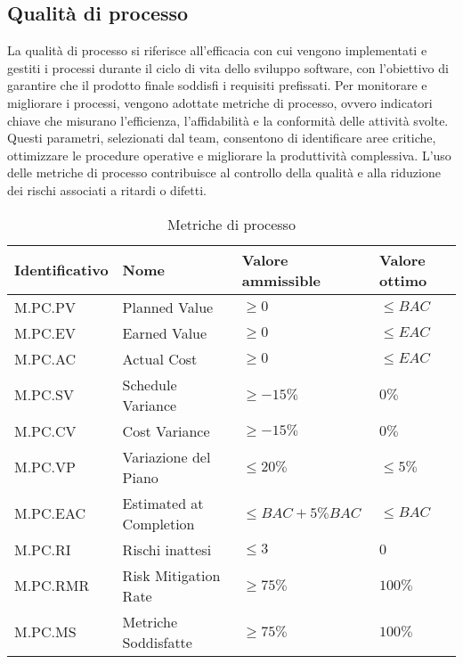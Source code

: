 \subsection{Qualità di processo}
\label{subsec:obiettivi_processo}
La qualità di processo si riferisce all'efficacia con cui vengono implementati e gestiti i processi durante il ciclo di vita dello sviluppo software, 
con l'obiettivo di garantire che il prodotto finale soddisfi i requisiti prefissati. 
Per monitorare e migliorare i processi, vengono adottate metriche di processo, ovvero indicatori chiave che misurano l'efficienza, l'affidabilità 
e la conformità delle attività svolte. 
Questi parametri, selezionati dal team, consentono di identificare aree critiche, ottimizzare le procedure operative e migliorare la produttività complessiva. 
L'uso delle metriche di processo contribuisce al controllo della qualità e alla riduzione dei rischi associati a ritardi o difetti.


\begin{table}[H]
    \centering
    \begin{tabular}{| l | l | l | l |}
    \hline
    \textbf{Identificativo} & 
    \textbf{Nome} &
    \textbf{Valore ammissible} &
    \textbf{Valore ottimo}\\
    \hline
        M.PC.PV & Planned Value & $\geq 0$ & $\leq BAC$ \\
    \hline
        M.PC.EV & Earned Value & $\geq 0$ & $\leq EAC$ \\
    \hline
        M.PC.AC & Actual Cost & $\geq 0$ & $\leq EAC$ \\
    \hline
        M.PC.SV & Schedule Variance & $\geq -15\%$ & $0\%$ \\
    \hline
        M.PC.CV & Cost Variance & $\geq -15\%$ & $0\%$ \\
    \hline  
        M.PC.VP & Variazione del Piano & $\leq 20\%$ & $\leq 5\%$ \\
    \hline
        M.PC.EAC & Estimated at Completion & $\leq BAC+5\% BAC$ & $\leq BAC$ \\
    \hline
        M.PC.RI & Rischi inattesi & $\leq 3$ & $0$ \\
    \hline
        M.PC.RMR & Risk Mitigation Rate & $\geq 75\%$ & $100\%$ \\
    \hline
        M.PC.MS & Metriche Soddisfatte & $\geq 75\%$ & $100\%$ \\
    \hline
    \end{tabular}
    \caption{Metriche di processo}
    \label{tab:metriche_processo} 
\end{table}